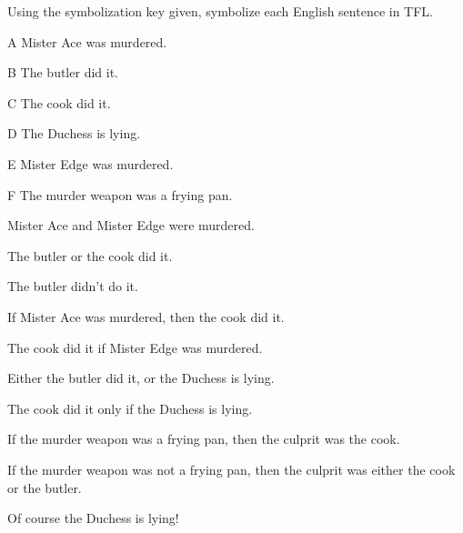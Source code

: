 \problempart Using the symbolization key given, symbolize each English sentence in TFL.
\begin{ekey}
\item[A] Mister Ace was murdered.
\item[B] The butler did it.
\item[C] The cook did it.
\item[D] The Duchess is lying.
\item[E] Mister Edge was murdered.
\item[F] The murder weapon was a frying pan.
\end{ekey}
\begin{earg}
\item Mister Ace and Mister Edge were murdered.
\item The butler or the cook did it.
\item The butler didn't do it.
\item If Mister Ace was murdered, then the cook did it.
\item The cook did it if Mister Edge was murdered.
\item Either the butler did it, or the Duchess is lying.
\item The cook did it only if the Duchess is lying.
\item If the murder weapon was a frying pan, then the culprit was the cook.
\item If the murder weapon was not a frying pan, then the culprit was either the cook or the butler.
\item Of course the Duchess is lying!
\end{earg}
\solutions

